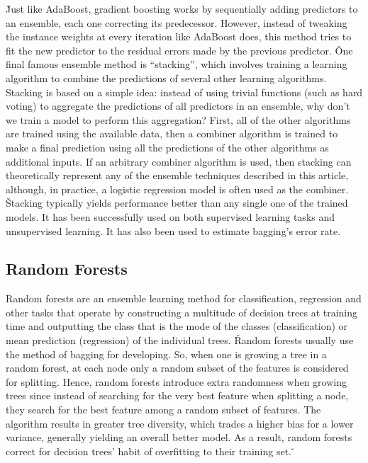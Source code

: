 
\v

Just like AdaBoost, gradient boosting works by sequentially adding predictors to an ensemble, each one correcting its
predecessor. However, instead of tweaking the instance weights at every iteration like AdaBoost does, this method
tries to fit the new predictor to the residual errors made by the previous predictor. \v

One final famous ensemble method is ``stacking'', which involves training a learning algorithm to combine the
predictions of several other learning algorithms. Stacking is based on a simple idea: instead of using trivial
functions (such as hard voting) to aggregate the predictions of all predictors in an ensemble, why don't we train a
model to perform this aggregation? First, all of the other algorithms are trained using the available data, then a
combiner algorithm is trained to make a final prediction using all the predictions of the other algorithms as
additional inputs. If an arbitrary combiner algorithm is used, then stacking can theoretically represent any of the
ensemble techniques described in this article, although, in practice, a logistic regression model is often used as
the combiner. \v

Stacking typically yields performance better than any single one of the trained models. It has been successfully used
on both supervised learning tasks and unsupervised learning. It has also been used to estimate bagging's error rate.

\subsection{Random Forests}

Random forests are an ensemble learning method for classification, regression and other tasks that operate by
constructing a multitude of decision trees at training time and outputting the class that is the mode of the classes
(classification) or mean prediction (regression) of the individual trees. \v

Random forests usually use the method of bagging for developing. So, when one is growing a tree in a random forest,
at each node only a random subset of the features is considered for splitting. Hence, random forests introduce extra
randomness when growing trees since instead of searching for the very best feature when splitting a node, they search
for the best feature among a random subset of features. The algorithm results in greater tree diversity, which trades
a higher bias for a lower variance, generally yielding an overall better model. As a result, random forests correct
for decision trees' habit of overfitting to their training set. \v

